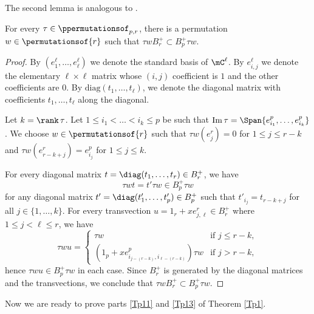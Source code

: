 The second lemma is analogous to \cite[Lemma 8.2]{FN2}.

\begin{lemma}
\label{L3.3}
For every $\tau\in\ppermutationsof_{p,r}$, there is a permutation $w\in\permutationsof{r}$
such that $\tau w B_r^+\subset B_p^+\tau w$.
\end{lemma}

\begin{proof}
By $(e_1^\ell,\ldots,e_\ell^\ell)$ we denote the standard basis of $\mC^\ell$. By $e_{i,j}^\ell$ we denote the elementary $\ell\times \ell$ matrix
whose $(i,j)$ coefficient is $1$ and the other coefficients are $0$. By $\mathrm{diag}(t_1,\ldots,t_\ell)$, we denote the diagonal matrix with coefficients $t_1,\ldots,t_\ell$ along the diagonal.

Let $k=\rank\,\tau$. Let $1\leq i_1<\ldots<i_k\leq p$ be such that $\mathrm{Im}\,\tau=\Span{e_{i_1}^p,\ldots,e_{i_k}^p}$.
We choose $w\in\permutationsof{r}$ such that $\tau w(e_j^r)=0$ for $1\leq j\leq r-k$ and $\tau w(e_{r-k+j}^r)=e_{i_j}^p$
for $1\leq j\leq k$.

For every diagonal matrix $t=\diag(t_1,\ldots,t_r)\in B_r^+$, we have
\[\tau w t=t'\tau w\in B_p^+\tau w\]
for any diagonal matrix $t'=\diag(t'_1,\ldots,t'_p)\in B_p^+$ such that $t'_{i_j}=t_{r-k+j}$ for all $j\in\{1,\ldots,k\}$.
For every transvection $u=1_r+xe_{j,\ell}^r\in B_r^+$ where $1\leq j<\ell\leq r$, we have
\[
\tau w u=\left\{\begin{array}{ll}
\tau w & \mbox{if $j\leq r-k$},\\
(1_p+xe_{i_{j-(r-k)},i_{\ell-(r-k)}}^p)\tau w & \mbox{if $j>r-k$},
\end{array}\right.
\]
hence $\tau wu\in B_p^+\tau w$ in each case. Since $B_r^+$ is generated by the diagonal matrices and the transvections, we conclude that $\tau w B_r^+\subset B_p^+\tau w$.
\end{proof}

Now we are ready to prove parts \ref{Tp11} and \ref{Tp13} of Theorem \ref{Tp1}.


